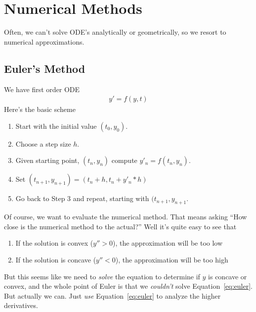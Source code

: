 \documentclass[12pt]{article}
\theoremstyle{plain}
\theoremstyle{definition}
\theoremstyle{remark}
\begin{document}
\clearpage
\section{Numerical Methods}

Often, we can't solve ODE's analytically or geometrically, so we resort
to numerical approximations.

\subsection{Euler's Method}

We have first order ODE
\begin{align}
  y' = f(y,t)
  \label{eq:euler}
\end{align}
Here's the basic scheme
\begin{enumerate}
  \item Start with the initial value $(t_0, y_0)$.
  \item Choose a step size $h$.
  \item Given starting point, $(t_n, y_n)$ compute $y'_n = f(t_n, y_n)$.
  \item Set $(t_{n+1}, y_{n+1}) = (t_n + h, t_n + y'_n*h)$
  \item Go back to Step 3 and repeat, starting with $(t_{n+1},y_{n+1}$.
\end{enumerate}
Of course, we want to evaluate the numerical method. That means asking
``How close is the numerical method to the actual?'' Well it's quite
easy to see that
\begin{enumerate}
  \item If the solution is convex ($y'' > 0$), the approximation will be
    too low
  \item If the solution is concave ($y'' < 0$), the approximation will
    be too high
\end{enumerate}
But this seems like we need to \emph{solve} the equation to determine if
$y$ is concave or convex, and the whole point of Euler is that we
\emph{couldn't} solve Equation~\ref{eq:euler}. But actually we can. Just
\emph{use} Equation~\ref{eq:euler} to analyze the higher derivatives.
\end{document}
